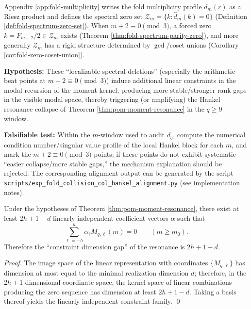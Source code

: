 \begin{conjecture}\label{conj:pom-fourier-zero-driven-resonance}
Appendix \ref{app:fold-multiplicity} writes the fold multiplicity profile \(d_m(r)\) as a Riesz product and defines the spectral zero set
\(
\mathcal{Z}_m=\{k:\widehat d_m(k)=0\}
\)
(Definition \ref{def:fold-spectrum-zero-set}). When \(m+2\equiv 0\pmod 3\), a forced zero \(k=F_{m+2}/2\in\mathcal{Z}_m\) exists (Theorem \ref{thm:fold-spectrum-parity-zero}), and more generally \(\mathcal{Z}_m\) has a rigid structure determined by \(\gcd\)/coset unions (Corollary \ref{cor:fold-zero-coset-union}).
\par
\textbf{Hypothesis:} These ``localizable spectral deletions'' (especially the arithmetic beat points at \(m+2\equiv 0\pmod 3\)) induce additional linear constraints in the modal recursion of the moment kernel, producing more stable/stronger rank gaps in the visible modal space, thereby triggering (or amplifying) the Hankel resonance collapse of Theorem \ref{thm:pom-moment-resonance} in the \(q\ge 9\) window.
\par
\textbf{Falsifiable test:} Within the \(m\)-window used to audit \(d_q\), compute the numerical condition number/singular value profile of the local Hankel block for each \(m\), and mark the \(m+2\equiv 0\pmod 3\) points; if these points do not exhibit systematic ``easier collapse/more stable gaps,'' the mechanism explanation should be rejected. The corresponding alignment output can be generated by the script \texttt{scripts/exp\_fold\_collision\_col\_hankel\_alignment.py} (see implementation notes).
\end{conjecture}



\begin{corollary}\label{cor:pom-resonance-deficit}
Under the hypotheses of Theorem \ref{thm:pom-moment-resonance}, there exist at least
\(
2h+1-d
\)
linearly independent coefficient vectors $\alpha$ such that
\[
\sum_{\ell=-h}^{h}\alpha_\ell M_{q,\ell}(m)=0\qquad(m\ge m_0).
\]
Therefore the ``constraint dimension gap'' of the resonance is $2h+1-d$.
\end{corollary}
\begin{proof}
The image space of the linear representation with coordinates $\{M_{q,\ell}\}$ has dimension at most equal to the minimal realization dimension $d$; therefore, in the $2h+1$-dimensional coordinate space, the kernel space of linear combinations producing the zero sequence has dimension at least $2h+1-d$. Taking a basis thereof yields the linearly independent constraint family. \qed
\end{proof}

